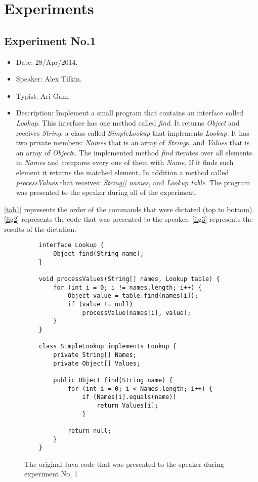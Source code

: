 \section{Experiments} \label{sec: Experiments}
\subsection{Experiment No.1}
\begin{itemize}
	\item Date: 28/Apr/2014.
	\item Speaker: Alex Tilkin.
	\item Typist: Ari Gam.
	\item Description: Implement a small program that contains an interface called \textit{Lookup}. This interface has one method called \textit{find}. It returns \textit{Object} and receives \textit{String}. a class called \textit{SimpleLookup} that implements \textit{Lookup}. It has two private members: \textit{Names} that is an array of \textit{String}s, and \textit{Values} that is an array of \textit{Object}s. The implemented method \textit{find} iterates over all elements in \textit{Names} and compares every one of them with \textit{Name}. If it finds such element it returns the matched element. In addition a method called \textit{processValues} that receives: \textit{String[] names}, and \textit{Lookup table}. The program was presented to the speaker during all of the experiment.
\end{itemize}
\autoref{tab1} represents the order of the commands that were dictated (top to bottom). \autoref{fig2} represents the code that was presented to the speaker. \autoref{fig3} represents the results of the dictation.
\begin{figure}[H]
	\begin{lstlisting}
	interface Lookup {
		Object find(String name);
	}
	
	void processValues(String[] names, Lookup table) {
		for (int i = 0; i != names.length; i++) {
			Object value = table.find(names[i]); 
			if (value != null)
				processValue(names[i], value); 
		}
	}
	
	class SimpleLookup implements Lookup {
		private String[] Names;
		private Object[] Values;
		
		public Object find(String name) {
			for (int i = 0; i < Names.length; i++) {
				if (Names[i].equals(name)) 
					return Values[i]; 
				}
				
			return null;
		}
	}
	\end{lstlisting}
	\caption{The original Java code that was presented to the speaker during experiment No. 1}
	\label{fig2}
\end{figure}
